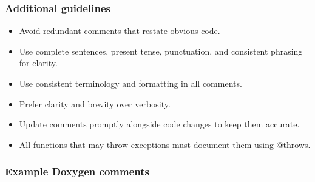 \subsubsection*{Additional guidelines}
\begin{itemize}
    \item Avoid redundant comments that restate obvious code.
    \item Use complete sentences, present tense, punctuation, and consistent phrasing for clarity.
    \item Use consistent terminology and formatting in all comments.
    \item Prefer clarity and brevity over verbosity.
    \item Update comments promptly alongside code changes to keep them accurate.
    \item All functions that may throw exceptions must document them using @throws. 
\end{itemize}

\subsubsection*{Example Doxygen comments}

